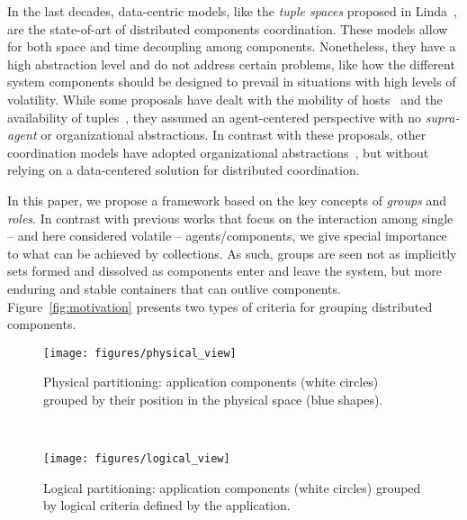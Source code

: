 In the last decades, data-centric models, like the \textit{tuple spaces} proposed in Linda~\cite{Gelernter:1985}, are the state-of-art of distributed components coordination. These models allow for both space and time decoupling among components. %
Nonetheless, they have a high abstraction level and do not address certain problems, like how the different system components should be designed to prevail in situations with high levels of volatility. While some proposals have dealt with the mobility of hosts~\cite{Murphy:2001, Mamei:2003} and the availability of tuples~\cite{Murphy:2006:2}, they assumed an agent-centered perspective with no \textit{supra-agent} or organizational abstractions. In contrast with these proposals, other coordination models have adopted organizational abstractions~\cite{Baresi:2011, Baresi:2011:2}, but without relying on a data-centered solution for distributed coordination. 

In this paper, we propose a framework based on the key concepts of \textit{groups} and \textit{roles}. In contrast with previous works that focus on the interaction among single -- and here considered volatile -- agents/components, we give special importance to what can be achieved by collections. As such, groups are seen not as implicitly sets formed and dissolved as components enter and leave the system, but more enduring and stable containers that can outlive components. Figure~\ref{fig:motivation} presents two types of criteria for grouping distributed components.

\begin{figure*}[t!]
    \centering
    \begin{subfigure}[b]{0.4\textwidth}
        \centering
        \texttt{[image: figures/physical\_view]}
        \caption{Physical partitioning: application components (white circles) grouped by their position in the physical space (blue shapes).}
    \end{subfigure}%
    ~ 
    \begin{subfigure}[b]{0.4\textwidth}
        \centering
        \texttt{[image: figures/logical\_view]}
        \caption{Logical partitioning: application components (white circles) grouped by logical criteria defined by the application.}
    \end{subfigure}
    \caption{Different grouping criteria.}
    \label{fig:motivation}
\end{figure*}

